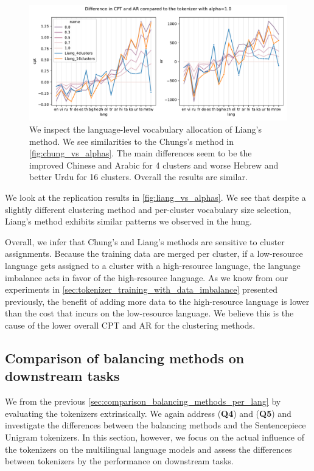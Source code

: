 \begin{figure}
    \centering
    \includegraphics[width=\textwidth]{figures/liang_vs_alphas.pdf}
    \caption{We inspect the language-level vocabulary allocation of Liang's method. We see similarities to the Chungs's method in \autoref{fig:chung_vs_alphas}. The main differences seem to be the improved Chinese and Arabic for 4 clusters and worse Hebrew and better Urdu for 16 clusters. Overall the results are similar.}
    \label{fig:liang_vs_alphas}
\end{figure}

We look at the \citet{liang_xlm-v_2023} replication results in \autoref{fig:liang_vs_alphas}. We see that despite a slightly different clustering method and per-cluster vocabulary size selection, Liang's method exhibits similar patterns we observed in the hung.

Overall, we infer that Chung's and Liang's methods are sensitive to cluster assignments. Because the training data are merged per cluster, if a low-resource language gets assigned to a cluster with a high-resource language, the language imbalance acts in favor of the high-resource language. As we know from our experiments in \autoref{sec:tokenizer_training_with_data_imbalance} presented previously, the benefit of adding more data to the high-resource language is lower than the cost that incurs on the low-resource language. We believe this is the cause of the lower overall CPT and AR for the clustering methods.

\subsection{Comparison of balancing methods on downstream tasks}

We  from the previous \autoref{sec:comparison_balancing_methods_per_lang} by evaluating the tokenizers extrinsically. We again address (\textbf{Q4}) and (\textbf{Q5}) and investigate the differences between the balancing methods and the Sentencepiece Unigram tokenizers. In this section, however, we focus on the actual influence of the tokenizers on the multilingual language models and assess the differences between tokenizers by the performance on downstream tasks.

